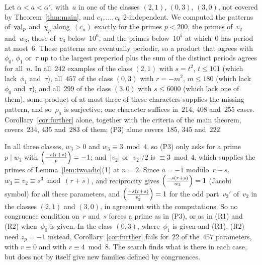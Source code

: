 \begin{remark}
  \label{rem:further-data}
  Let $\alpha < a < \alpha'$, with~$a$ in one of the classes $(2,1)$, $(0,3)$, $(3,0)$, not covered
  by Theorem~\ref{thm:main}, and $c_1, \dots, c_6$ $2$-independent. We computed the patterns
  of~$\operatorname{val}_p$ and~$\chi_p$ along~$(c_n)$ exactly for the primes $p < 200$, the primes of~$v_2$
  and~$w_3$, those of~$v_3$ below~$10^6$, and the primes below~$10^5$ at which~$0$ has period at
  most~$6$. These patterns are eventually periodic, so a product that agrees with~$\phi_0$, $\phi_1$
  or~$\tau$ up to the largest preperiod plus the sum of the distinct periods agrees for all~$n$. In
  all~$242$ examples of the class $(2,1)$ with $s = t^2$, $t \le 101$ (which lack~$\phi_1$
  and~$\tau$), all~$457$ of the class $(0,3)$ with $r = -m^2$, $m \le 180$ (which lack~$\phi_0$
  and~$\tau$), and all~$299$ of the class $(3,0)$ with $s \le 6000$ (which lack one of them), some
  product of at most three of these characters supplies the missing pattern, and so~$\rho_a$ is
  surjective; one character suffices in~$214$, $408$ and~$255$ cases. Corollary~\ref{cor:further}
  alone, together with the criteria of the main theorem, covers~$234$, $435$ and~$283$ of them;
  (P3) alone covers~$185$, $345$ and~$222$.

  In all three classes, $w_3 > 0$ and $w_3 \equiv 3 \bmod 4$, so (P3) only asks for a prime
  $p \mid w_3$ with $\left(\frac{-s(r+s)}{p}\right) = -1$; and~$|v_2|$ or $|v_2|/2$ is $\equiv 3 \bmod 4$, which
  supplies the primes of Lemma~\ref{lem:twoadic}(1) at $n = 2$. Since
  $\bar a = -1$ modulo~$r + s$, $w_3 \equiv v_2 \equiv s^3 \bmod (r + s)$, and reciprocity gives
  $\left(\frac{-s(r+s)}{w_3}\right) = 1$ (Jacobi symbol) for all these parameters, and
  $\left(\frac{-s(r+s)}{v_2'}\right) = 1$ for the odd part~$v_2'$ of~$v_2$ in the classes $(2,1)$ and $(3,0)$,
  in agreement with the computations. So no congruence condition on~$r$ and~$s$ forces a prime as
  in (P3), or as in (R1) and (R2) when~$\phi_0$ is given. In the class $(0,3)$, where~$\phi_1$ is
  given and (R1), (R2) need $z_p = -1$ instead, Corollary~\ref{cor:further} fails for~$22$ of
  the~$457$ parameters, with $r \equiv 0$ and with $r \equiv 4 \bmod 8$. The search finds what is
  there in each case, but does not by itself give new families defined by congruences.
\end{remark}

